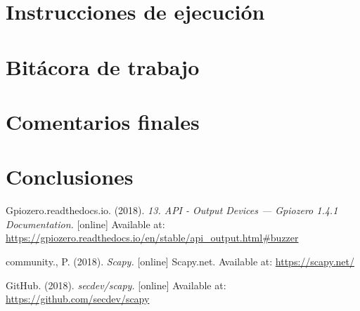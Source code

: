 \documentclass{article}
\begin{document}
\section{Instrucciones de ejecuci\'on}
\section{Bit\'acora de trabajo}
\section{Comentarios finales}
\section{Conclusiones}

\begin{thebibliography}{9}
  Gpiozero.readthedocs.io. (2018). \emph{13. API - Output Devices — Gpiozero 1.4.1 Documentation.}
  [online] Available at: \url{https://gpiozero.readthedocs.io/en/stable/api\_output.html\#buzzer}
  
  community., P. (2018). \emph{Scapy.}
  [online] Scapy.net. Available at: \url{https://scapy.net/}
  
   GitHub. (2018). \emph{secdev/scapy.}
  [online] Available at: \url{https://github.com/secdev/scapy}
\end{thebibliography}
\end{document}
